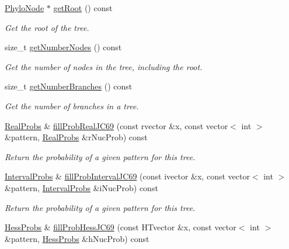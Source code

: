 \begin{DoxyCompactItemize}
\hyperlink{classPhyloNode}{\-Phylo\-Node} $\ast$ \hyperlink{classPhyloTree_a5ede1337d40e3e211e83d9f009b062f9}{get\-Root} () const 
\begin{DoxyCompactList}\small\item\em \-Get the root of the tree. \end{DoxyCompactList}\item 
size\-\_\-t \hyperlink{classPhyloTree_a0d1f91c11b0b4dd5091f44d0f4dda0c7}{get\-Number\-Nodes} () const 
\begin{DoxyCompactList}\small\item\em \-Get the number of nodes in the tree, including the root. \end{DoxyCompactList}\item 
size\-\_\-t \hyperlink{classPhyloTree_ae7557f8269350a3ee6ba18f9bd63b7e6}{get\-Number\-Branches} () const 
\begin{DoxyCompactList}\small\item\em \-Get the number of branches in a tree. \end{DoxyCompactList}\item 
\hyperlink{PhyloTree_8hpp_a9a6f7e127d1279875ce95b0b6a331114}{\-Real\-Probs} \& \hyperlink{classPhyloTree_ac490ccd50ba543a3f58f70e79d5c7c24}{fill\-Prob\-Real\-J\-C69} (const rvector \&x, const vector$<$ int $>$ \&pattern, \hyperlink{PhyloTree_8hpp_a9a6f7e127d1279875ce95b0b6a331114}{\-Real\-Probs} \&r\-Nuc\-Prob) const 
\begin{DoxyCompactList}\small\item\em \-Return the probability of a given pattern for this tree. \end{DoxyCompactList}\item 
\hyperlink{PhyloTree_8hpp_af4bedfc3c110381d3675cf92e28539db}{\-Interval\-Probs} \& \hyperlink{classPhyloTree_ae1efe7ad349b169e80116a959553e37a}{fill\-Prob\-Interval\-J\-C69} (const ivector \&x, const vector$<$ int $>$ \&pattern, \hyperlink{PhyloTree_8hpp_af4bedfc3c110381d3675cf92e28539db}{\-Interval\-Probs} \&i\-Nuc\-Prob) const 
\begin{DoxyCompactList}\small\item\em \-Return the probability of a given pattern for this tree. \end{DoxyCompactList}\item 
\hyperlink{PhyloTree_8hpp_a8ee2b3678316ad48baa269e4ee7db7f7}{\-Hess\-Probs} \& \hyperlink{classPhyloTree_a0b7e1230aa0c30b38a2778b0281a5183}{fill\-Prob\-Hess\-J\-C69} (const \-H\-Tvector \&x, const vector$<$ int $>$ \&pattern, \hyperlink{PhyloTree_8hpp_a8ee2b3678316ad48baa269e4ee7db7f7}{\-Hess\-Probs} \&h\-Nuc\-Prob) const 

\end{DoxyCompactItemize}
